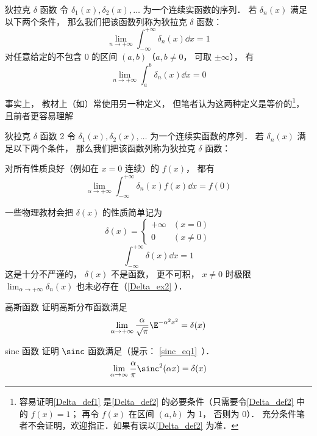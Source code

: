 \begin{definition}{狄拉克 $\delta$ 函数}\label{Delta_def1}
令 $\delta_1(x), \delta_2(x), \dots$ 为一个连续实函数的序列． 若 $\delta_n(x)$ 满足以下两个条件， 那么我们把该函数列称为狄拉克 $\delta$ 函数：
\begin{equation}\label{Delta_eq5}
\lim_{n\to+\infty}\int_{-\infty}^{+\infty} \delta_n(x) \dd{x} = 1
\end{equation}
对任意给定的不包含 0 的区间 $(a,b)$（$a,b \ne 0$， 可取 $\pm\infty$）， 有
\begin{equation}\label{Delta_eq4}
\lim_{n\to+\infty} \int_{a}^{b} \delta_n(x) \dd{x} = 0
\end{equation}
\end{definition}
事实上， 教材上（如\cite{Arfken}）常使用另一种定义， 但笔者认为这两种定义是等价的\footnote{容易证明\autoref{Delta_def1} 是\autoref{Delta_def2} 的必要条件（只需要令\autoref{Delta_def2} 中的 $f(x) = 1$； 再令 $f(x)$ 在区间 $(a,b)$ 为 1， 否则为 0）． 充分条件笔者不会证明，欢迎指正．如果有误以\autoref{Delta_def2} 为准．}， 且前者更容易理解

\begin{definition}{狄拉克 $\delta$ 函数 2}\label{Delta_def2}
令 $\delta_1(x), \delta_2(x), \dots$ 为一个连续实函数的序列． 若 $\delta_n(x)$ 满足以下两个条件， 那么我们把该函数列称为狄拉克 $\delta$ 函数：

对所有性质良好（例如在 $x = 0$ 连续）的 $f(x)$， 都有
\begin{equation}
\lim_{\alpha\to+\infty}\int_{-\infty}^{+\infty} \delta_n(x)f(x) \dd{x} = f(0)
\end{equation}
\end{definition}

一些物理教材会把 $\delta(x)$ 的性质简单记为
\begin{equation}\label{Delta_eq2}
\delta(x) =
\begin{cases}
+\infty & (x = 0)\\
0 & (x \ne 0)
\end{cases}
\end{equation}
\begin{equation}\label{Delta_eq3}
\int_{-\infty}^{+\infty} \delta(x) \dd{x} = 1
\end{equation}
这是十分不严谨的， $\delta(x)$ 不是函数， 更不可积， $x \ne 0$ 时极限 $\lim_{\alpha\to+\infty}\delta_n(x)$ 也未必存在（\autoref{Delta_ex2} ）．

\begin{exercise}{高斯函数}
证明高斯分布函数满足
\begin{equation}
\lim_{\alpha\to+\infty}\frac{\alpha}{\sqrt{\pi}} \E^{-{\alpha ^2}x^2} = \delta(x)
\end{equation}
\end{exercise}
\begin{exercise}{sinc 函数}\label{Delta_exe1}
证明 $\sinc$ 函数满足（提示： \autoref{sinc_eq1}~）．
\begin{equation}
\lim_{\alpha\to\infty}\frac{\alpha}{\pi}\sinc^2(\alpha x) = \delta(x)
\end{equation}
\end{exercise}

